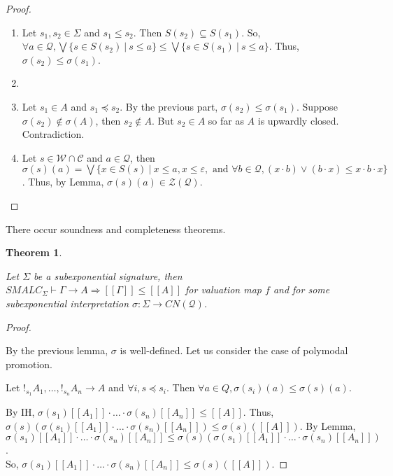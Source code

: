 \documentclass[a4paper]{article}
\theoremstyle{defin}
\theoremstyle{theorem}
\newtheorem{theorem}{Theorem}
\theoremstyle{prop}
\theoremstyle{lemma}
\theoremstyle{ex}
\theoremstyle{col}
\begin{document}
\begin{proof}
  $ $

  \begin{enumerate}
  \item Let $s_1, s_2 \in \Sigma$ and $s_1 \leq s_2$. Then $S(s_2) \subseteq S(s_1)$.
  So, $\forall a \in \mathcal{Q}, \bigvee \{ s \in S(s_2) \: | \: s \leq a \} \leq \bigvee \{ s \in S(s_1) \: | \: s \leq a \}$. Thus, $\sigma(s_2) \leq \sigma(s_1)$.
  \item
  \item Let $s_1 \in A$ and $s_1 \preceq s_2$. By the previous part, $\sigma(s_2) \leq \sigma(s_1)$. Suppose $\sigma(s_2) \notin \sigma(A)$, then $s_2 \notin A$. But $s_2 \in A$ so far as $A$ is upwardly closed. Contradiction.
  \item Let $s \in \mathcal{W} \cap \mathcal{C}$ and $a \in \mathcal{Q}$,
  then $\sigma(s)(a) = \bigvee \{ x \in S(s) \: | \: x \leq a, x \leq \varepsilon, \text{ and } \forall b \in \mathcal{Q}, (x \cdot b) \vee (b \cdot x) \leq x \cdot b \cdot x \}$. Thus, by Lemma, $\sigma(s)(a) \in \mathcal{Z}(\mathcal{Q})$.

\end{enumerate}
\end{proof}

There occur soundness and completeness theorems.

\begin{theorem}
$ $

  Let $\Sigma$ be a subexponential signature, then
  $SMALC_{\Sigma} \vdash \Gamma \rightarrow A \Rightarrow [\![\Gamma]\!] \leq [\![A]\!]$ for valuation map $f$ and for some subexponential interpretation $\sigma : \Sigma \to CN(\mathcal{Q})$.
\end{theorem}

\begin{proof}
  $ $

By the previous lemma, $\sigma$ is well-defined. Let us consider the case of polymodal promotion.

Let $!_{s_1} A_1, \dots, !_{s_n} A_n \rightarrow A$ and $\forall i, s \preceq s_i$. Then $\forall a \in Q, \sigma(s_i)(a) \leq \sigma(s)(a)$.

By IH, $\sigma(s_1)[\![A_1]\!] \cdot \dots \cdot \sigma(s_n) [\![A_n]\!] \leq [\![A]\!]$. Thus,
$\sigma(s)(\sigma(s_1)[\![A_1]\!] \cdot \dots \cdot \sigma(s_n) [\![A_n]\!]) \leq \sigma(s)([\![A]\!])$. By Lemma,
$\sigma(s_1)[\![A_1]\!] \cdot \dots \cdot \sigma(s_n) [\![A_n]\!] \leq \sigma(s)(\sigma(s_1)[\![A_1]\!] \cdot \dots \cdot
\sigma(s_n) [\![A_n]\!])$. \\
So, $\sigma(s_1)[\![A_1]\!] \cdot \dots \cdot \sigma(s_n) [\![A_n]\!] \leq \sigma(s)([\![A]\!])$.
\end{proof}
\end{document}
